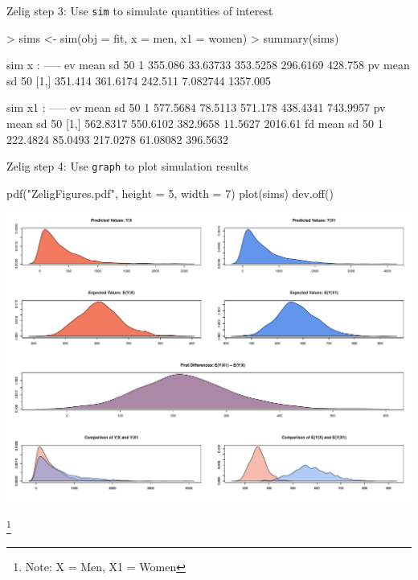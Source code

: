 \documentclass{beamer}
\begin{document}
\begin{frame}[fragile]{Zelig step 3: Use \texttt{sim} to simulate quantities of interest}
\begin{tiny}
\begin{semiverbatim}
> sims <- sim(obj = fit, x = men, x1 = women)
> summary(sims)

 sim x :
 -----
ev
     mean       sd      50%
1 355.086 33.63733 353.5258 296.6169 428.758
pv
        mean       sd     50%
[1,] 351.414 361.6174 242.511 7.082744 1357.005

 sim x1 :
 -----
ev
      mean      sd     50%
1 577.5684 78.5113 571.178 438.4341 743.9957
pv
         mean       sd      50%
[1,] 562.8317 550.6102 382.9658 11.5627 2016.61
fd
      mean      sd      50%
1 222.4824 85.0493 217.0278 61.08082 396.5632
\end{semiverbatim}
\end{tiny}
\end{frame}

\begin{frame}[fragile]{Zelig step 4: Use \texttt{graph} to plot simulation results}
\begin{scriptsize}
\begin{semiverbatim}
pdf("ZeligFigures.pdf",
    height = 5, width = 7)
plot(sims)
dev.off()
\end{semiverbatim}
\end{scriptsize}
\begin{center}\includegraphics[height = .7\textheight]{figs/ZeligFigures.pdf}\end{center}\footnote{
Note: X = Men, X1 = Women}
\end{frame}
\end{document}
